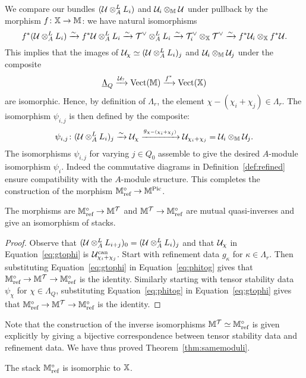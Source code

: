 \documentclass[12pt]{amsart}
\begin{document}
We compare our bundles $(\mathcal{U} \otimes_A^L L_i)$ and $\mathcal{U}_i \otimes_{\mathbb{M}} \mathcal{U}$ under pullback by the morphism $f \colon \mathbb{X} \rightarrow \mathbb{M}$: we have natural isomorphisms
\begin{equation} \label{eq:natisolinebdls}
f^*(\mathcal{U} \otimes_A^L L_i) \xrightarrow{\sim} f^* \mathcal{U} \otimes_A^L L_i \xrightarrow{\sim} 
\mathcal{T}^{\vee} \otimes_A^L L_i \xrightarrow{\sim} \mathcal{T}_i^\vee \otimes_{\mathbb{X}} \mathcal{T}^{\vee} \xrightarrow{\sim} 
f^*\mathcal{U}_{i} \otimes_{\mathbb{X}} f^* \mathcal{U}.
\end{equation}
This implies that the images of $\mathcal{U}_\chi \simeq (\mathcal{U} \otimes_A^L L_i)_j$ and $\mathcal{U}_i \otimes_{\mathbb{M}} \mathcal{U}_j$ under the composite $$\underline{\Lambda}_{Q} \xrightarrow{\mathcal{U}_?} \operatorname{Vect}(\mathbb{M}) \xrightarrow{f^*} \operatorname{Vect}(\mathbb{X})$$ are isomorphic.
Hence, by definition of $\Lambda_r$, the element $\chi-(\chi_i+\chi_j) \in \Lambda_r$.
The isomorphism $\psi_{i,j}$ is then defined by the composite:
\begin{equation}\label{eq:gtophi}
\psi_{i,j} \colon (\mathcal{U} \otimes_A^L L_i)_j \xrightarrow{\sim} \mathcal{U}_\chi \xrightarrow{g_{\chi-(\chi_i+\chi_j)}} \mathcal{U}_{\chi_i + \chi_j} = \mathcal{U}_i \otimes_{\mathbb{M}} \mathcal{U}_j.
\end{equation}
The isomorphisms $\psi_{i,j}$ for varying $j \in Q_0$ assemble to give the desired $A$-module isomorphism $\psi_i$. 
Indeed the commutative diagrams in Definition~\ref{def:refined} ensure compatibility with the $A$-module structure. 
This completes the construction of the morphism $\mathbb{M}^\circ_{\text{ref}} \rightarrow \mathbb{M}^{\operatorname{Pic}}$.


\begin{theorem}\label{thm:mutualinverses}
The morphisms are $\mathbb{M}^\circ_{\textup{ref}} \rightarrow \mathbb{M}^{\mathcal{T}}$ and $\mathbb{M}^{\mathcal{T}} \rightarrow \mathbb{M}_\textup{ref}^\circ$ are mutual quasi-inverses and give an isomorphism of stacks. 
\end{theorem}

\begin{proof}
Observe that $(\mathcal{U} \otimes_A^L L_{i+j})_0 = (\mathcal{U} \otimes_A^L L_i)_j$ and that $\mathcal{U}_\chi$ in Equation~\ref{eq:gtophi} is $\mathcal{U}^{\text{can}}_{\chi_i+\chi_j}$.
Start with refinement data $g_\kappa$ for $\kappa \in \Lambda_r$.
Then substituting Equation~\ref{eq:gtophi} in Equation~\ref{eq:phitog} gives that $\mathbb{M}^\circ_{\textup{ref}} \rightarrow \mathbb{M}^{\mathcal{T}} \rightarrow \mathbb{M}_\textup{ref}^\circ$ is the identity.
Similarly starting with tensor stability data $\psi_\chi$ for $\chi \in \Lambda_Q$, substituting Equation~\ref{eq:phitog} in Equation~\ref{eq:gtophi} gives that $\mathbb{M}^\circ_{\textup{ref}} \rightarrow \mathbb{M}^{\mathcal{T}} \rightarrow \mathbb{M}_\textup{ref}^\circ$ is the identity.
\end{proof}
Note that the construction of the inverse isomorphisms $\mathbb{M}^{\mathcal{T}} \simeq \mathbb{M}^{\circ}_{\textup{ref}}$ is given explicitly by giving a bijective correspondence between tensor stability data and refinement data. We have thus proved Theorem~\ref{thm:samemoduli}.
\begin{corollary}\label{cor:mref}   
The stack $\mathbb{M}_\textup{ref}^\circ$ is isomorphic to $\mathbb{X}$.
\end{corollary}
\end{document}
